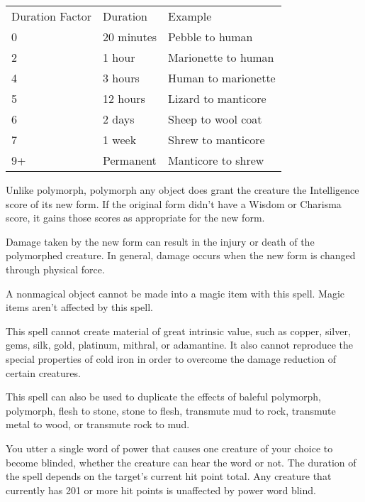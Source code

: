 \begin{multicols}{2}
\begin{small}
\begin{center}
\begin{tabular}[h!]{l|ll}
Duration Factor & Duration & Example \\
0 & 20 minutes & Pebble to human \\
2 & 1 hour & Marionette to human \\
4 & 3 hours & Human to marionette	\\
5 & 12 hours & Lizard to manticore \\
6 & 2 days & Sheep to wool coat	\\
7 & 1 week & Shrew to manticore	\\
9+& Permanent & Manticore to shrew \\
\end{tabular}
\end{center}

\smallskip\noindent Unlike polymorph, polymorph any object does grant the creature the Intelligence score of its new form. If the original form didn't have a Wisdom or Charisma score, it gains those scores as appropriate for the new form.

\smallskip\noindent Damage taken by the new form can result in the injury or death of the polymorphed creature. In general, damage occurs when the new form is changed through physical force.

\smallskip\noindent A nonmagical object cannot be made into a magic item with this spell. Magic items aren't affected by this spell.

\smallskip\noindent This spell cannot create material of great intrinsic value, such as copper, silver, gems, silk, gold, platinum, mithral, or adamantine. It also cannot reproduce the special properties of cold iron in order to overcome the damage reduction of certain creatures.

\smallskip\noindent This spell can also be used to duplicate the effects of baleful polymorph, polymorph, flesh to stone, stone to flesh, transmute mud to rock, transmute metal to wood, or transmute rock to mud.


\noindent You utter a single word of power that causes one creature of your choice to become blinded, whether the creature can hear the word or not. The duration of the spell depends on the target's current hit point total. Any creature that currently has 201 or more hit points is unaffected by power word blind.


\end{small}
\end{multicols}
